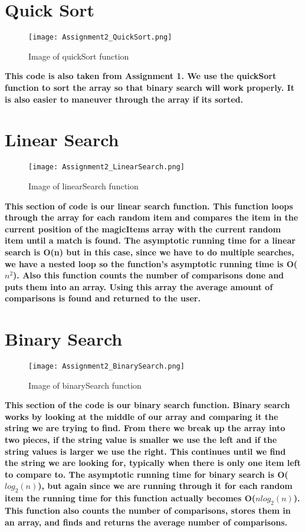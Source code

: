\documentclass{article}
\begin{document}
\section{Quick Sort}
\begin{figure}[h]
    \centering
    \texttt{[image: Assignment2\_QuickSort.png]}
    \caption{Image of quickSort function}
    \label{fig:quickSort}
\end{figure}
\textbf{This code is also taken from Assignment 1. We use the quickSort function to sort the array so that binary search will work properly. It is also easier to maneuver through the array if its sorted.}
\newpage

\section{Linear Search}
\begin{figure}[h]
    \centering
    \texttt{[image: Assignment2\_LinearSearch.png]}
    \caption{Image of linearSearch function}
    \label{fig:linearSearch}
\end{figure}
\textbf{This section of code is our linear search function. This function loops through the array for each random item and compares the item in the current position of the magicItems array with the current random item until a match is found. The asymptotic running time for a linear search is O(n) but in this case, since we have to do multiple searches, we have a nested loop so the function's asymptotic running time is O($n^2$). Also this function counts the number of comparisons done and puts them into an array. Using this array the average amount of comparisons is found and returned to the user.}
\newpage

\section{Binary Search}
\begin{figure}[h]
    \centering
    \texttt{[image: Assignment2\_BinarySearch.png]}
    \caption{Image of binarySearch function}
    \label{fig:binarySearch}
\end{figure}
\textbf{This section of the code is our binary search function. Binary search works by looking at the middle of our array and comparing it the string we are trying to find. From there we break up the array into two pieces, if the string value is smaller we use the left and if the string values is larger we use the right. This continues until we find the string we are looking for, typically when there is only one item left to compare to. The asymptotic running time for binary search is O($log_2(n)$), but again since we are running through it for each random item the running time for this function actually becomes O($nlog_2(n)$). This function also counts the number of comparisons, stores them in an array, and finds and returns the average number of comparisons.}
\newpage
\end{document}
